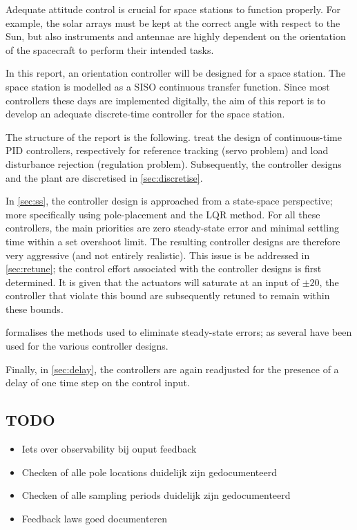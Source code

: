 Adequate attitude control is crucial for space stations to function properly. For example, the solar arrays must be kept at the correct angle with respect to the Sun, but also instruments and antennae are highly dependent on the orientation of the spacecraft to perform their intended tasks.

In this report, an orientation controller will be designed for a space station. The space station is modelled as a SISO continuous transfer function. Since most controllers these days are implemented digitally, the aim of this report is to develop an adequate discrete-time controller for the space station.

The structure of the report is the following.  treat the design of continuous-time PID controllers, respectively for reference tracking (servo problem) and load disturbance rejection (regulation problem). Subsequently, the controller designs and the plant are discretised in \cref{sec:discretise}. 

In \cref{sec:ss}, the controller design is approached from a state-space perspective; more specifically using pole-placement and the LQR method.
For all these controllers, the main priorities are zero steady-state error and minimal settling time within a set overshoot limit. The resulting controller designs are therefore very aggressive (and not entirely realistic). This issue is be addressed in \cref{sec:retune}; the control effort associated with the controller designs is first determined. It is given that the actuators will saturate at an input of $\pm20$, the controller that violate this bound are subsequently retuned to remain within these bounds.

 formalises the methods used to eliminate steady-state errors; as several have been used for the various controller designs. 

Finally, in \cref{sec:delay}, the controllers are again readjusted for the presence of a delay of one time step on the control input.

\subsection*{TODO}
\begin{itemize}
    \item Iets over observability bij ouput feedback
    \item Checken of alle pole locations duidelijk zijn gedocumenteerd
    \item Checken of alle sampling periods duidelijk zijn gedocumenteerd
    \item Feedback laws goed documenteren
\end{itemize}